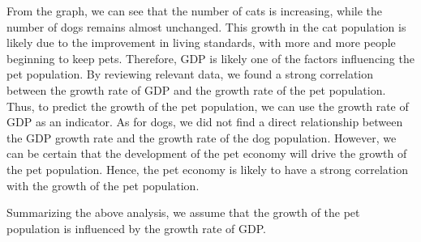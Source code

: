\documentclass[withoutpreface,bwprint]{cumcmthesis} %
\begin{document}
\par From the graph, we can see that the number of cats is increasing, while the number of dogs remains almost unchanged. This growth in the cat population is likely due to the improvement in living standards, with more and more people beginning to keep pets.
Therefore, GDP is likely one of the factors influencing the pet population. By reviewing relevant data, we found a strong correlation between the growth rate of GDP and the growth rate of the pet population.
Thus, to predict the growth of the pet population, we can use the growth rate of GDP as an indicator.
As for dogs, we did not find a direct relationship between the GDP growth rate and the growth rate of the dog population. However, we can be certain that the development of the pet economy will drive the growth of the pet population.
Hence, the pet economy is likely to have a strong correlation with the growth of the pet population.
\par Summarizing the above analysis, we assume that the growth of the pet population is influenced by the growth rate of GDP.
\end{document}
